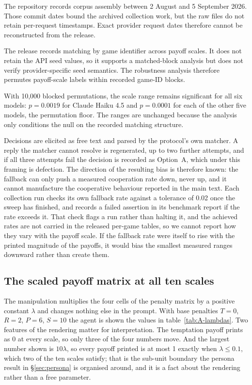 \documentclass[11pt,a4paper]{article}
\newcommand{\lam}{\lambda}
\begin{document}
The repository records corpus assembly between 2 August and 5 September 2026.
Those commit dates bound the archived collection work, but the raw files do not
retain per-request timestamps. Exact provider request dates therefore cannot be
reconstructed from the release.

The release records matching by game identifier across payoff scales. It does
not retain the API seed values, so it supports a matched-block analysis but
does not verify provider-specific seed semantics. The robustness analysis
therefore permutes payoff-scale labels within recorded game-ID blocks.

With 10,000 blocked permutations, the scale range remains significant for all
six models: $p=0.0019$ for Claude Haiku 4.5 and $p=0.0001$ for each of the
other five models, the permutation floor. The ranges are unchanged because the
analysis only conditions the null on the recorded matching structure.

Decisions are elicited as free text and parsed by the protocol's own matcher. A
reply the matcher cannot resolve is regenerated, up to two further attempts,
and if all three attempts fail the decision is recorded as Option~A, which
under this framing is defection. The direction of the resulting bias is
therefore known: the fallback can only push a measured cooperation rate down,
never up, and it cannot manufacture the cooperative behaviour reported in the
main text. Each collection run checks its own fallback rate against a tolerance
of 0.02 once the sweep has finished, and records a failed assertion in its
benchmark report if the rate exceeds it. That check flags a run rather than
halting it, and the achieved rates are not carried in the released per-game
tables, so we cannot report how they vary with the payoff scale. If the fallback rate were itself to rise with the printed magnitude of
the payoffs, it would bias the smallest measured ranges downward rather than
create them.

\subsection{The scaled payoff matrix at all ten scales}\label{appendix:payoff_scaling}

The manipulation multiplies the four cells of the penalty matrix by a positive
constant $\lam$ and changes nothing else in the prompt. With base penalties
$T = 0$, $R = 2$, $P = 6$, $S = 10$ the agent is shown the values in
table~\ref{tab:A-lambdas}. Two features of the rendering matter for
interpretation. The temptation payoff prints as 0 at every scale, so only three
of the four numbers move. And the largest number shown is $10\lam$, so every
payoff printed is at most 1 exactly when $\lam \leq 0.1$, which two of the ten
scales satisfy; that is the sub-unit boundary the persona result in
\S\ref{sec:persona} is organised around, and it is a fact about the rendering
rather than a free parameter.
\end{document}

